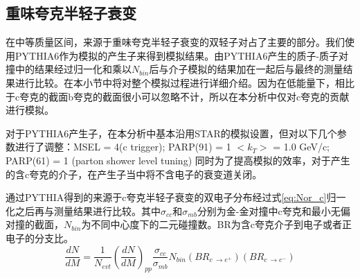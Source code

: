 \subsection{重味夸克半轻子衰变}

在中等质量区间，来源于重味夸克半轻子衰变的双轻子对占了主要的部分。我们使用PYTHIA6作为模拟的产生子来得到模拟结果。由PYTHIA6产生的质子-质子对撞中的结果经过归一化和乘以$N_{bin}$后与介子模拟的结果加在一起后与最终的测量结果进行比较。在本小节中将对整个模拟过程进行详细介绍。因为在低能量下，相比于c夸克的截面b夸克的截面很小可以忽略不计，所以在本分析中仅对c夸克的贡献进行模拟。

对于PYTHIA6产生子，在本分析中基本沿用STAR的模拟设置，但对以下几个参数进行了调整：MSEL = 4(c trigger); PARP(91) = 1 $<k_T>$ = 1.0 GeV/c; PARP(61) = 1 (parton shower level tuning)
同时为了提高模拟的效率，对于产生的含c夸克的介子，在产生子当中将不含电子的衰变道关闭。

通过PYTHIA得到的来源于c夸克半轻子衰变的双电子分布经过式\ref{eq:Nor_c}归一化之后再与测量结果进行比较。其中$\sigma_{cc}$和$\sigma_{mb}$分别为金-金对撞中c夸克和最小无偏对撞的截面，$N_{bin}$为不同中心度下的二元碰撞数。BR为含c夸克介子到电子或者正电子的分支比。
\begin{equation}
    \label{eq:Nor_c}
    \frac{dN}{dM} = \frac{1}{N_{evt}} (\frac{dN}{dM})_{pp} \frac{\sigma_{cc}}{\sigma_{mb}} N_{bin} (BR_{c~\rightarrow e^+}) (BR_{c~\rightarrow e^-})
\end{equation}

